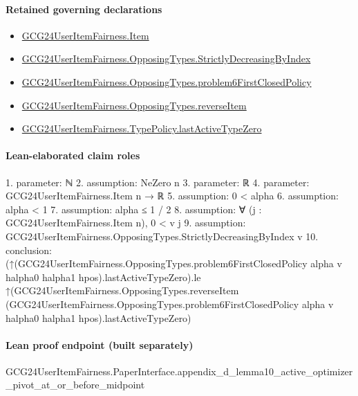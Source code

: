\documentclass[10pt]{article}
\begin{document}
\paragraph{Retained governing declarations}
\begin{itemize}\raggedright
\item \hyperlink{governing-declaration-a7c560a429c6e204}{GCG24\allowbreak{}User\allowbreak{}Item\allowbreak{}Fairness.\allowbreak{}Item}
\item \hyperlink{governing-declaration-8278344d2ddef9a8}{GCG24\allowbreak{}User\allowbreak{}Item\allowbreak{}Fairness.\allowbreak{}Opposing\allowbreak{}Types.\allowbreak{}Strictly\allowbreak{}Decreasing\allowbreak{}By\allowbreak{}Index}
\item \hyperlink{governing-declaration-c9eb0ce285dbfd64}{GCG24\allowbreak{}User\allowbreak{}Item\allowbreak{}Fairness.\allowbreak{}Opposing\allowbreak{}Types.\allowbreak{}problem6\allowbreak{}First\allowbreak{}Closed\allowbreak{}Policy}
\item \hyperlink{governing-declaration-c12a8e29d370ae70}{GCG24\allowbreak{}User\allowbreak{}Item\allowbreak{}Fairness.\allowbreak{}Opposing\allowbreak{}Types.\allowbreak{}reverse\allowbreak{}Item}
\item \hyperlink{governing-declaration-8a85b9f21510683a}{GCG24\allowbreak{}User\allowbreak{}Item\allowbreak{}Fairness.\allowbreak{}Type\allowbreak{}Policy.\allowbreak{}last\allowbreak{}Active\allowbreak{}Type\allowbreak{}Zero}
\end{itemize}
\paragraph{Lean-elaborated claim roles}\begin{ReviewVerbatim}
1. parameter: ℕ
2. assumption: NeZero n
3. parameter: ℝ
4. parameter: GCG24UserItemFairness.Item n → ℝ
5. assumption: 0 < alpha
6. assumption: alpha < 1
7. assumption: alpha ≤ 1 / 2
8. assumption: ∀ (j : GCG24UserItemFairness.Item n), 0 < v j
9. assumption: GCG24UserItemFairness.OpposingTypes.StrictlyDecreasingByIndex v
10. conclusion: (↑(GCG24UserItemFairness.OpposingTypes.problem6FirstClosedPolicy alpha v halpha0 halpha1 hpos).lastActiveTypeZero).le
  ↑(GCG24UserItemFairness.OpposingTypes.reverseItem
      (GCG24UserItemFairness.OpposingTypes.problem6FirstClosedPolicy alpha v halpha0 halpha1 hpos).lastActiveTypeZero)
\end{ReviewVerbatim}

\paragraph{Lean proof endpoint (built separately)}\begin{ReviewVerbatim}
GCG24UserItemFairness.PaperInterface.appendix_d_lemma10_active_optimizer_pivot_at_or_before_midpoint
\end{ReviewVerbatim}
\end{document}
